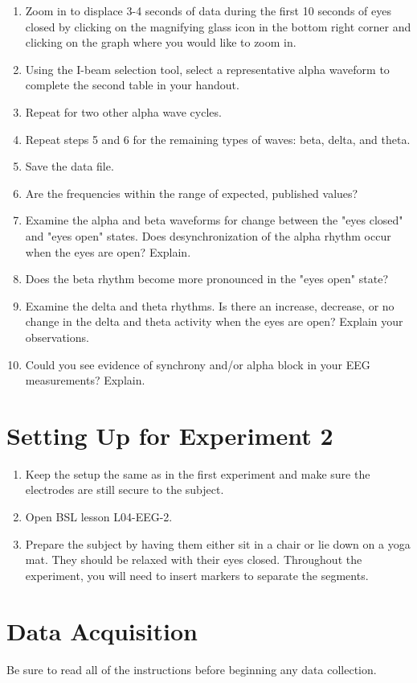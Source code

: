 \documentclass{article}
\begin{document}
\begin{enumerate}
	\item Zoom in to displace 3-4 seconds of data during the first 10 seconds of eyes closed by clicking on the magnifying glass icon in the bottom right corner and clicking on the graph where you would like to zoom in.
	\item Using the I-beam selection tool, select a representative alpha waveform to complete the second table in your handout.
	\item Repeat for two other alpha wave cycles.
	\item Repeat steps 5 and 6 for the remaining types of waves: beta, delta, and theta.
	\item Save the data file.
	\item Are the frequencies within the range of expected, published values?
	\item Examine the alpha and beta waveforms for change between the "eyes closed" and "eyes open" states. Does desynchronization of the alpha rhythm occur when the eyes are open? Explain.
	\item Does the beta rhythm become more pronounced in the "eyes open" state?
	\item Examine the delta and theta rhythms. Is there an increase, decrease, or no change in the delta and theta activity when the eyes are open? Explain your observations.
	\item Could you see evidence of synchrony and/or alpha block in your EEG measurements? Explain.
\end{enumerate}

\section*{Setting Up for Experiment 2}
\begin{enumerate}
	\item Keep the setup the same as in the first experiment and make sure the electrodes are still secure to the subject.
	\item Open BSL lesson L04-EEG-2.
	\item Prepare the subject by having them either sit in a chair or lie down on a yoga mat. They should be relaxed with their eyes closed. Throughout the experiment, you will need to insert markers to separate the segments.
\end{enumerate}

\section*{Data Acquisition}
Be sure to read all of the instructions before beginning any data collection.
\end{document}
